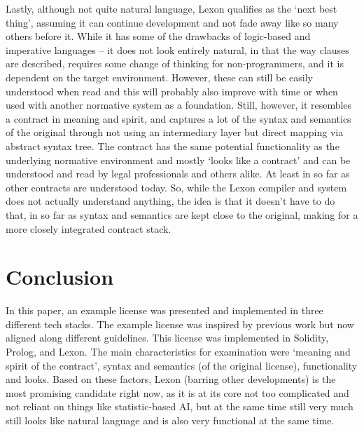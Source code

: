 \documentclass{article}
\begin{document}
Lastly, although not quite natural language, %
Lexon qualifies as the ‘next best thing’, assuming it can continue development and not fade away like so many others before it. While it has some of the drawbacks of logic-based and imperative languages – it does not look entirely natural, in that the way clauses are described, requires some change of thinking for non-programmers, %
and it is dependent on the target environment.
However, these can still be easily understood when read and this will probably also improve with time or when used with another normative system as a foundation. 
Still, however, it resembles a contract in meaning and spirit, and captures a lot of the syntax and semantics of the original through not using an intermediary layer but direct mapping via abstract syntax tree. The contract has the same potential functionality as the underlying normative environment %
and mostly ‘looks like a contract’ and can be understood and read by legal professionals and others alike. At least in so far as other contracts are understood today. %
So, while the Lexon compiler and system does not actually understand anything, the idea is that it doesn’t have to do that, in so far as syntax and semantics are kept close to the original, making for a more closely integrated contract stack.

\section{Conclusion}
In this paper, an example license was presented and implemented in three different tech stacks. %
The example license was inspired by previous work but now aligned along different guidelines. This license was implemented in Solidity, Prolog, %
and Lexon. The main characteristics for examination were ‘meaning and spirit of the contract’, syntax and semantics (of the original license), functionality and looks. Based on these factors, Lexon (barring other developments)
is the most promising candidate right now, as it is at its core not too complicated and not reliant on things like statistic-based AI, but at the same time still very much still looks like natural language and is also very functional at the same time. %
\end{document}
